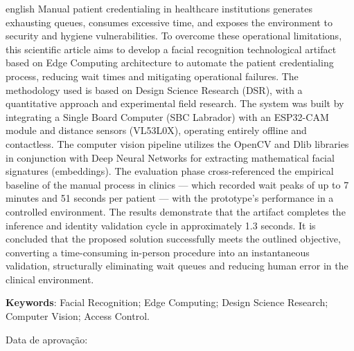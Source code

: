 \begin{resumo}[ABSTRACT]
    \begin{otherlanguage*}{english}
        Manual patient credentialing in healthcare institutions generates exhausting queues, consumes excessive time, and exposes the environment to security and hygiene vulnerabilities. To overcome these operational limitations, this scientific article aims to develop a facial recognition technological artifact based on Edge Computing architecture to automate the patient credentialing process, reducing wait times and mitigating operational failures. The methodology used is based on Design Science Research (DSR), with a quantitative approach and experimental field research. The system was built by integrating a Single Board Computer (SBC Labrador) with an ESP32-CAM module and distance sensors (VL53L0X), operating entirely offline and contactless. The computer vision pipeline utilizes the OpenCV and Dlib libraries in conjunction with Deep Neural Networks for extracting mathematical facial signatures (embeddings). The evaluation phase cross-referenced the empirical baseline of the manual process in clinics — which recorded wait peaks of up to 7 minutes and 51 seconds per patient — with the prototype's performance in a controlled environment. The results demonstrate that the artifact completes the inference and identity validation cycle in approximately 1.3 seconds. It is concluded that the proposed solution successfully meets the outlined objective, converting a time-consuming in-person procedure into an instantaneous validation, structurally eliminating wait queues and reducing human error in the clinical environment.  
        
        \vspace{\onelineskip}
        \noindent
        \textbf{Keywords}: Facial Recognition; Edge Computing; Design Science Research; Computer Vision; Access Control.
    \end{otherlanguage*}
\end{resumo}

\vspace{\onelineskip}
\noindent
Data de aprovação: \imprimirdataaprovacao

\vspace{1cm}

\makeatletter
\renewcommand{\textual}{%
  \pagestyle{ifpihead}
  \aliaspagestyle{chapter}{ifpihead}
  \nouppercaseheads
}
\makeatother

\textual
